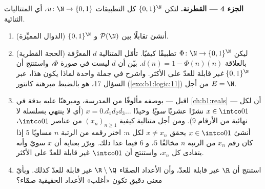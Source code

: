 \begin{problem}
\medskip
\noindent\textbf{الجزء 4 --- القطرنة.} لتكن $\{0,1\}^{\N}$
 كل التطبيقات $u \colon \N \to \{0, 1\}$، أي 
المتتاليات الثنائية.
\begin{enumerate}[resume]
  \item أنشئ تقابلًا بين $\mathcal{P}(\N)$ و
        $\{0,1\}^{\N}$ (الدوال المميِّزة).
  \item (الحجة القطرية) ليكن $\Phi \colon \N \to
        \{0,1\}^{\N}$ تطبيقًا كيفيًا. تأمّل المتتالية $d$ المعرَّفة بالعلاقة $d(n) = 1 - \Phi(n)(n)$. بيّن أن $d$ ليست في
        صورة $\Phi$، واستنتج أن $\{0,1\}^{\N}$ \emph{غير} قابلة
        للعدّ على الأكثر. واشرح في جملة واحدة لماذا يكون هذا،
        عبر السؤال 17، هو بالضبط مبرهنة كانتور
        (\cref{exo:b1:logic:11}) من أجل $E = \N$.
  \item اقبل --- بوصفه مألوفًا من المدرسة، ومبرهنًا عليه بدقة في
        \cref{ch:b1:reals} --- أن لكل $x \in
        \intco01$ نشرًا عشريًا \emph{سويًا} وحيدًا $x =
        0.d_1 d_2 d_3\dots$ (أي لا ينتهي بسلسلة لا نهائية من
        الأرقام $9$). ومن أجل متتالية كيفية $(x_n)_{n \geq 1}$ من
        عناصر $\intco01$، أنشئ $x \in \intco01$ يحقق $x \neq x_n$
        لكل $n$: اختر رقمه من الرتبة $n$ مساويًا $5$ إذا كان رقم
        $x_n$ من الرتبة $n$ مخالفًا $5$، و $6$ فيما عدا ذلك. وبرّر
        بعناية أن $x$ سويّ وأنه يتفادى كل $x_n$، واستنتج أن
        $\intco01$ غير قابلة للعدّ على الأكثر.
  \item استنتج أن $\R$ غير قابلة للعدّ، وأن  الأعداد الصمّاء
        $\R
        \setminus \Q$ غير قابلة للعدّ كذلك.
        وبأيّ معنى دقيق تكون «أغلب» الأعداد الحقيقية صمّاء؟
\end{enumerate}


\end{problem}
